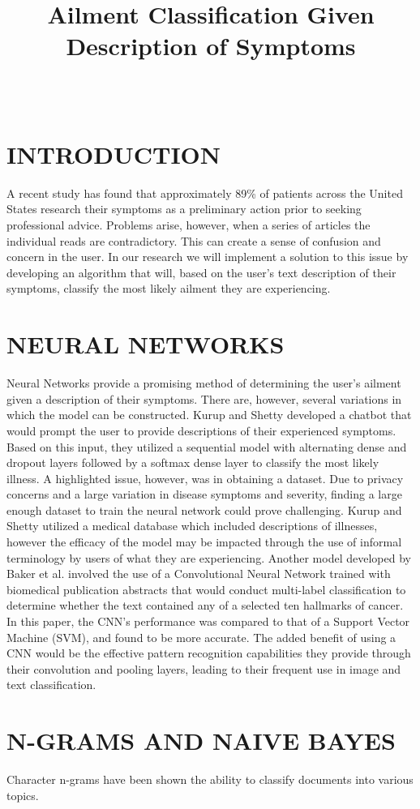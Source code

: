 \documentclass[10pt, final, comsoc, conference]{IEEEtran}
\begin{document}
\title{Ailment Classification Given Description of Symptoms}
\author{
	\\
}

\maketitle
\section{\MakeTextUppercase{Introduction}}
A recent study has found that approximately 89\% of patients across the United States
research their symptoms as a preliminary action prior to seeking professional advice.
Problems arise, however, when a series of articles the individual reads are contradictory.
This can create a sense of confusion and concern in the user.
In our research we will implement a solution to this issue by developing an algorithm that will,
based on the user's text description of their symptoms, classify the most likely ailment
they are experiencing.

\section{\MakeTextUppercase{Neural Networks}}
Neural Networks provide a promising method of determining the user’s ailment given a description of their symptoms.
There are, however, several variations in which the model can be constructed.
Kurup and Shetty developed a chatbot that would prompt the user to provide descriptions of their experienced symptoms.
Based on this input, they utilized a sequential model with alternating dense and dropout layers followed by a softmax dense layer to classify the most likely illness.
A highlighted issue, however, was in obtaining a dataset.
Due to privacy concerns and a large variation in disease symptoms and severity, finding a large enough dataset to train the neural network could prove challenging.
Kurup and Shetty utilized a medical database which included descriptions of illnesses, however the efficacy of the model may be impacted through the use of informal terminology by users of what they are experiencing.
Another model developed by Baker et al. involved the use of a Convolutional Neural Network trained with biomedical publication abstracts that would conduct multi-label classification to determine whether the text contained any of a selected ten hallmarks of cancer.
In this paper, the CNN’s performance was compared to that of a Support Vector Machine (SVM), and found to be more accurate.
The added benefit of using a CNN would be the effective pattern recognition capabilities they provide through their convolution and pooling layers, leading to their frequent use in image and text classification.

\section{\MakeTextUppercase{n-Grams and Naive Bayes}}
Character n-grams have been shown the ability to classify documents into various topics.
\end{document}
